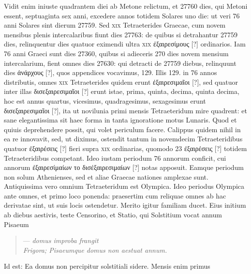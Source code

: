 Vidit enim iniuste quadrantem diei ab Metone relictum, et
27760 dies, qui Metoni essent, septuaginta sex anni, excedere annos
totidem Solares uno die: ut veri 76 anni Solares sint dierum 27759.
Sed \textsc{xix} Tetraeterides Graecae, cum novem mensibus
 plenis intercalaribus
fiunt dies 27763: de quibus si detrahantur 27759 dies, relinquentur
dies quatuor eximendi ultra \textsc{xix} \textgreek{ἐξαιρεσίμους [?]} ordinarios.
Iam
76 anni Graeci sunt dies 27360, quibus si adieceris 270 dies novem
mensium intercalarium, fient omnes dies 27630: qui detracti de
27759 diebus, relinquunt dies \textgreek{ἀνάρχους [?]},
 quos appendices vocavimus,
129.
Illis 129. in 76 annos distributis, omnes \textsc{xix}
 Tetraeterides quidem
erunt \textgreek{ἐξαιρεσιμαῖοι [?]}, sed quatuor inter illas
 \textgreek{δισεξαιρεσιμαῖοι [?]} erunt istae,
prima, quinta, decima, quinta decima, hoc est annus quartus, vicesimus,
quadragesimus, sexagesimus erunt \textgreek{δισεξαιρεσιμαῖοι [?]},
 ita ut novilunia primi
mensis Tetraeteridum mire quadrent: et sane elegantissima sit haec
forma in tanta ignoratione motus Lunaris.
Quod et quiuis deprehendere
possit, qui volet periculum facere.
Calippus quidem nihil in
ea re innovavit, sed, ut diximus, ostendit tantum in novemdecim Tetraeteridibus
quatuor \textgreek{ἐξαιρέσεις [?]} fieri supra \textsc{xix} ordinarias,
 quomodo 23
\textgreek{ἐξαιρέσεις [?]} totidem Tetraeteridibus competant.
Ideo iustam periodum
76 annorum conficit, cui annorum
 \textgreek{ἐξαιρεσίμαίων το δισέξαιρεσιμαίων [?]} notas
apposuit.
Eamque periodum non solum Athenienses, sed et aliae
Graecae nationes amplexae sunt.
Antiquissima vero omnium Tetraeteridum
est Olympica.
Ideo periodus Olympica ante omnes, et primo
loco ponenda: praesertim cum reliquae omnes ab hac derivatae sint, ut
suis locis ostendetur.
Merito igitur familiam ducet.
Eius initium ab diebus
aestivis, teste Censorino, et Statio, qui Solstitium vocat annum
Pisaeum
\begin{quote}
--- \emph{domus improba frangit}\\
\emph{Frigora; Pisaeumque domus non aestuat annum.}
\end{quote}
Id est: Ea domus non percipitur solstitiali sidere.
Mensis enim primus
